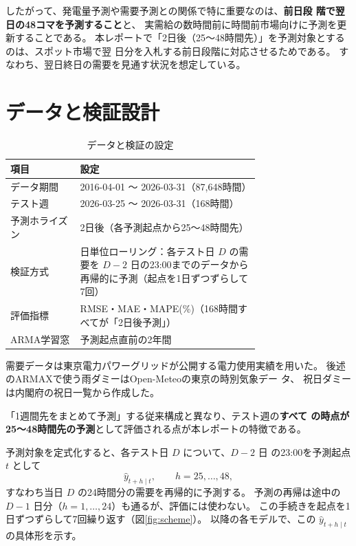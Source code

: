 \documentclass[a4paper,11pt]{ltjsarticle}
\begin{document}
したがって、発電量予測や需要予測との関係で特に重要なのは、\textbf{前日段
階で翌日の48コマを予測すること}と、
実需給の数時間前に時間前市場向けに予測を更新することである。
本レポートで「2日後（25〜48時間先）」を予測対象とするのは、スポット市場で翌
日分を入札する前日段階に対応させるためである。
すなわち、翌日終日の需要を見通す状況を想定している。

\section{データと検証設計}

\begin{table}[htbp]
  \centering
  \caption{データと検証の設定}
  \begin{tabular}{lp{0.72\linewidth}}
    \toprule
    項目 & 設定 \\
    \midrule
    データ期間 & 2016-04-01 〜 2026-03-31（87,648時間） \\
    テスト週 & 2026-03-25 〜 2026-03-31（168時間） \\
    予測ホライズン & 2日後（各予測起点から25〜48時間先） \\
    検証方式 & 日単位ローリング：各テスト日 $D$ の需要を $D-2$ 日の23:00までのデータから再帰的に予測（起点を1日ずつずらして7回） \\
    評価指標 & RMSE・MAE・MAPE(\%)（168時間すべてが「2日後予測」） \\
    ARMA学習窓 & 予測起点直前の2年間 \\
    \bottomrule
  \end{tabular}
\end{table}

需要データは東京電力パワーグリッドが公開する電力使用実績\cite{tepco}を用いた。
後述のARMAXで使う雨ダミーはOpen-Meteoの東京の時別気象デー
タ\cite{openmeteo}、
祝日ダミーは内閣府の祝日一覧\cite{cao}から作成した。

「1週間先をまとめて予測」する従来構成と異なり、テスト週の\textbf{すべて
の時点が25〜48時間先の予測}として評価される点が本レポートの特徴である。

予測対象を定式化すると、各テスト日 $D$ について、$D-2$ 日
の23:00を予測起点 $t$ として
\begin{equation*}
  \hat{y}_{t+h\mid t}, \qquad h = 25, \dots, 48,
\end{equation*}
すなわち当日 $D$ の24時間分の需要を再帰的に予測する。
予測の再帰は途中の $D-1$ 日分（$h=1,\dots,24$）も通るが、評価には使わない。
この手続きを起点を1日ずつずらして7回繰り返す（図\ref{fig:scheme}）。
以降の各モデルで、この $\hat{y}_{t+h\mid t}$ の具体形を示す。
\end{document}
